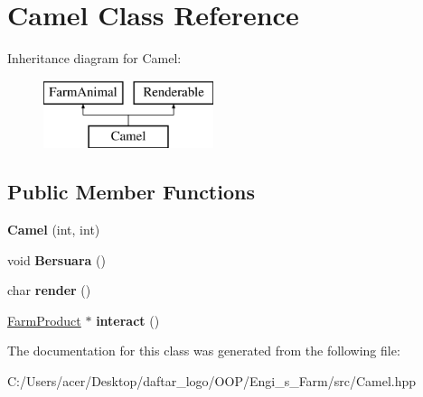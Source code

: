 \hypertarget{class_camel}{}\section{Camel Class Reference}
\label{class_camel}
Inheritance diagram for Camel\+:\begin{figure}[H]
\begin{center}
\leavevmode
\includegraphics[height=2.000000cm]{class_camel}
\end{center}
\end{figure}
\subsection*{Public Member Functions}
\begin{DoxyCompactItemize}
\item 
\mbox{\label{class_camel_a4f6e2857878ee23eb21dd50dac64d6fc}} 
{\bfseries Camel} (int, int)
\item 
\mbox{\label{class_camel_a7a1e8a70e336920283f9aa9e39374902}} 
void {\bfseries Bersuara} ()
\item 
\mbox{\label{class_camel_ae8b2448ea69d5dd31c8eddbc1f6c5e14}} 
char {\bfseries render} ()
\item 
\mbox{\label{class_camel_a7513bb60b5d74f90eadc736414bed14b}} 
\mbox{\hyperlink{class_farm_product}{Farm\+Product}} $\ast$ {\bfseries interact} ()
\end{DoxyCompactItemize}


The documentation for this class was generated from the following file\+:\begin{DoxyCompactItemize}
\item 
C\+:/\+Users/acer/\+Desktop/daftar\+\_\+logo/\+O\+O\+P/\+Engi\+\_\+s\+\_\+\+Farm/src/Camel.\+hpp\end{DoxyCompactItemize}
